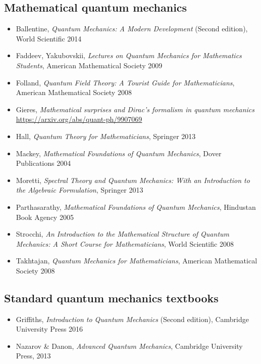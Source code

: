 
\subsection*{Mathematical quantum mechanics}

\begin{itemize}
\item Ballentine, \textit{Quantum Mechanics: A Modern Development} (Second edition), World Scientific 2014
\item Faddeev, Yakubovskii, \textit{Lectures on Quantum Mechanics for Mathematics Students}, American Mathematical Society 2009
\item Folland, \textit{Quantum Field Theory: A Tourist Guide for Mathematicians},  American Mathematical Society 2008
\item Gieres, \textit{Mathematical surprises and Dirac's formalism in quantum mechanics}\\
\url{https://arxiv.org/abs/quant-ph/9907069}
\item Hall, \textit{Quantum Theory for Mathematicians}, Springer 2013
\item Mackey, \textit{Mathematical Foundations of Quantum Mechanics}, Dover Publications 2004
\item Moretti, \textit{Spectral Theory and Quantum Mechanics: With an Introduction to the Algebraic Formulation}, Springer 2013
\item Parthasarathy, \textit{Mathematical Foundations of Quantum Mechanics}, Hindustan Book Agency 2005
\item Strocchi, \textit{An Introduction to the Mathematical Structure of Quantum Mechanics: A Short Course for Mathematicians}, World Scientific 2008
\item Takhtajan, \textit{Quantum Mechanics for Mathematicians}, American Mathematical Society 2008
\end{itemize}

\subsection*{Standard quantum mechanics textbooks}

\begin{itemize}
    \item Griffiths, \textit{Introduction to Quantum Mechanics} (Second edition), Cambridge University Press 2016
    \item Nazarov \& Danon, \textit{Advanced Quantum Mechanics}, Cambridge University Press, 2013
\end{itemize}


